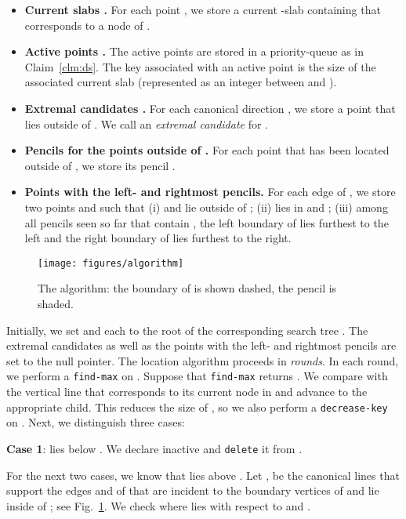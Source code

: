 \documentclass[letterpaper,11pt]{article}
\newcommand{\findmax}{\texttt{find-max}}
\newcommand{\delete}{\texttt{delete}}
\newcommand{\deckey}{\texttt{decrease-key}}
\begin{document}
\begin{itemize}
\item 
\textbf{Current slabs .}
  For each point , 
  we store a current -slab  
  containing  that corresponds 
  to a node of . 
\item \textbf{Active points .}
  The active points are stored in a 
  priority-queue  as in 
  Claim~\ref{clm:ds}. The key associated 
  with an active point  is the size 
  of the associated current slab  
  (represented as an integer between  and ).
\item \textbf{Extremal candidates .}
  For each canonical direction 
  , we store a point
   that lies outside 
  of .  We call  an 
  \emph{extremal candidate} for .
\item
  \textbf{Pencils for the points outside of .}
  For each point  that has been 
  located outside of , we store its
  pencil .
\item
  \textbf{Points with the left- and rightmost pencils.}
  For each edge  of , we store two  
  points 
  and  such that 
  (i)  and  lie outside of ;  
  (ii)  lies in  and ;
  (iii) among all pencils seen 
  so far that contain , the left boundary of 
    lies furthest to the left 
  and the right boundary of   
  lies furthest to the right. 
\end{itemize}

\begin{figure}
  \centering
  \texttt{[image: figures/algorithm]}
  \caption{The algorithm:  the boundary 
  of  is shown dashed, the pencil 
   is shaded.}
  \label{fig:algorithm}
\end{figure}

Initially, we set  and each 
 to the root of the corresponding search
tree . The extremal candidates 
 as well as the points 
 with the left- and 
rightmost pencils are set to the 
null pointer. The location algorithm 
proceeds in \emph{rounds}. In each round, 
we perform a \findmax{} on . 
Suppose that \findmax{} returns .
We compare  with the vertical 
line that corresponds to its current node
in  and advance  to 
the appropriate child. This reduces the
size of , so we also perform a 
\deckey{} on . Next, we distinguish 
three cases:

\noindent\textbf{Case 1}:  lies below 
. We declare  
inactive and \delete{} it from .

For the next two cases, we know 
that  lies above .
Let ,  be the canonical 
lines that support the edges
 and  of  that are 
incident to the boundary vertices of
 and lie inside of ; see 
Fig.~\ref{fig:algorithm}.
We check where  lies with respect 
to  and .
\end{document}
